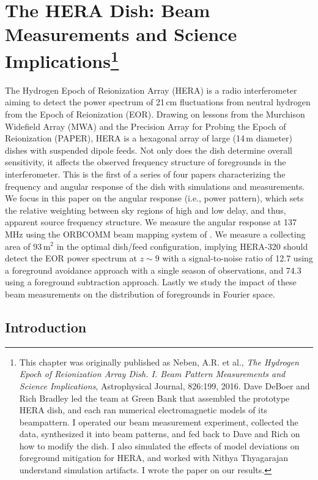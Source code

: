 
\chapter[The HERA Dish: Beam Measurements and Science Implications]{The HERA Dish: Beam Measurements and Science Implications\footnote{This chapter was originally published as Neben, A.R. et al., \textit{The Hydrogen Epoch of Reionization Array Dish. I. Beam Pattern Measurements and Science Implications}, Astrophysical Journal, 826:199, 2016. Dave DeBoer and Rich Bradley led the team at Green Bank that assembled the prototype HERA dish, and each ran numerical electromagnetic models of its beampattern. I operated our beam measurement experiment, collected the data, synthesized it into beam patterns, and fed back to Dave and Rich on how to modify the dish. I also simulated the effects of model deviations on foreground mitigation for HERA, and worked with Nithya Thyagarajan understand simulation artifacts. I wrote the paper on our results.}}
\label{chap:herapaper}

The Hydrogen Epoch of Reionization Array (HERA) is a radio interferometer aiming to detect the power spectrum of 21\,cm fluctuations from neutral hydrogen from the Epoch of Reionization (EOR). Drawing on lessons from the Murchison Widefield Array (MWA) and the Precision Array for Probing the Epoch of Reionization (PAPER), HERA is a hexagonal array of large (14\,m diameter) dishes with suspended dipole feeds. Not only does the dish determine overall sensitivity, it affects the observed frequency structure of foregrounds in the interferometer. This is the first of a series of four papers characterizing the frequency and angular response of the dish with simulations and measurements. We focus in this paper on the angular response (i.e., power pattern), which sets the relative weighting between sky regions of high and low delay, and thus, apparent source frequency structure. We measure the angular response at 137\,MHz using the ORBCOMM beam mapping system of \citet{neben15}. We measure a collecting area of 93\,m$^2$ in the optimal dish/feed configuration, implying HERA-320 should detect the EOR power spectrum at $z\sim9$ with a signal-to-noise ratio of 12.7 using a foreground avoidance approach with a single season of observations, and 74.3 using a foreground subtraction approach. Lastly we study the impact of these beam measurements on the distribution of foregrounds in Fourier space.

\section{Introduction}

